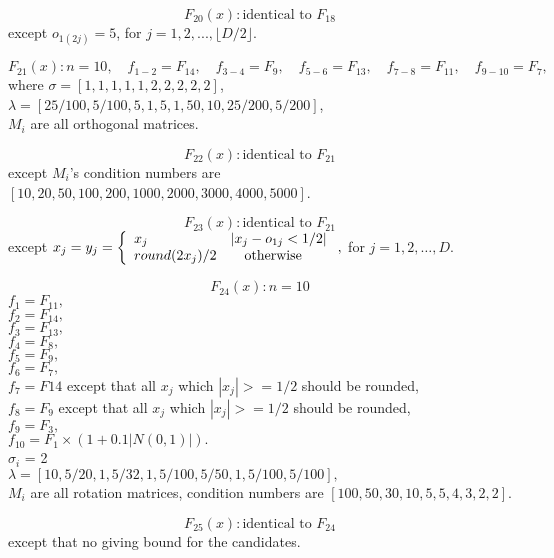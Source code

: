 \[F_{20}(x): \text{identical to $F_{18}$}\]
except $o_{1(2j)} = 5$, for $j = 1,2,...,\lfloor{D/2}\rfloor.$

\[F_{21}(x): n = 10,\quad f_{1-2} = F_{14}, \quad f_{3-4} = F_9, \quad
f_{5-6} = F_{13}, \quad f_{7-8} = F_{11}, \quad f_{9-10}= F_7,\]
where $\sigma = [1,1,1,1,1,2,2,2,2,2]$,\\$\lambda =
[25/100,5/100,5,1,5,1,50,10,25/200,5/200]$,\\$M_i$ are all orthogonal
matrices.

\[F_{22}(x): \text{identical to $F_{21}$}\]
except ${M_i}$'s condition numbers are
$[10,20,50,100,200,1000,2000,3000,4000,5000]$.

\[F_{23}(x): \text{identical to $F_{21}$}\]
except 
$x_j = y_j = \left\{ 
    \begin{array}{l l}
      x_j & |x_j -o_{1j} < 1/2|\\
      round(2x_j)/2 & \quad \text{otherwise}
                \end{array} \right.,$ for $j = 1,2,\ldots,D$.

\[F_{24}(x): n=10\]
$f_1 = F_{11},$\\
$f_2 = F_{14},$\\
$f_3 = F_{13},$\\
$f_4 = F_8   ,$\\
$f_5 = F_9   ,$\\
$f_6 = F_7   ,$\\
$f_7 = F{14}$ except that all $x_j$ which $|x_j| >=1/2$ should be
rounded,\\
$f_8 = F_9  $ except that all $x_j$ which $|x_j| >=1/2$ should be
rounded,\\
$f_9 = F_3,$\\
$f_{10}= F_1 \times (1+0.1|N(0,1)|).$\\
$\sigma_i$ = 2\\
$\lambda = [10,5/20,1,5/32,1,5/100,5/50,1,5/100,5/100],$\\
$M_i$ are all rotation matrices, condition numbers are
$[100,50,30,10,5,5,4,3,2,2].$

\[F_{25}(x): \text{identical to $F_{24}$}\]
except that no giving bound for the candidates.\\
